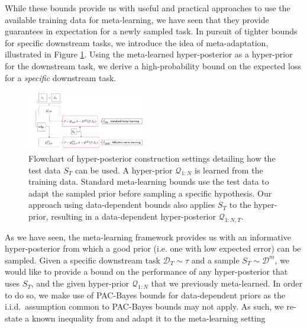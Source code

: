 \documentclass[letterpaper]{article} %
\theoremstyle{definition}
\begin{document}
While these bounds provide us with useful and practical approaches to use the available training data for meta-learning, we have seen that they provide guarantees in expectation for a newly sampled task. In pursuit of tighter bounds for specific downstream tasks, we introduce the idea of meta-adaptation, illustrated in Figure \ref{fig:data_dependant_bound}. Using the meta-learned hyper-posterior as a hyper-prior for the downstream task, we derive a high-probability bound on the expected loss for a \emph{specific} downstream task. 

\begin{figure}[t]
	\centering
	\includegraphics[width=0.47\textwidth]{data_dependant_adaptation.PNG}
	\caption{Flowchart of hyper-posterior construction settings detailing how the test data $S_T$ can be used. A hyper-prior $\mathcal{Q}_{1:N}$ is learned from the training data. Standard meta-learning bounds use the test data to adapt the sampled prior before sampling a specific hypothesis. Our approach using data-dependent bounds also applies $S_T$ to the hyper-prior, resulting in a data-dependent hyper-posterior $\mathcal{Q}_{1:N, T}$. }
	\label{fig:data_dependant_bound}
\end{figure}

As we have seen, the meta-learning framework provides us with an informative hyper-posterior from which a good prior (i.e.\! one with low expected error) can be sampled. Given a specific downstream task $\mathcal{D}_T\sim \tau$ and a sample $S_T\sim \mathcal{D}^m$, we would like to provide a bound on the performance of any hyper-posterior that uses $S_T$, and the given hyper-prior $\mathcal{Q}_{1:N}$ that we previously meta-learned. In order to do so, we make use of PAC-Bayes bounds for data-dependent priors as the i.i.d.\ assumption common to PAC-Bayes bounds may not apply. As such, we re-state a known inequality from \citet{Rivasplata2020} and adapt it to the meta-learning setting
\end{document}
